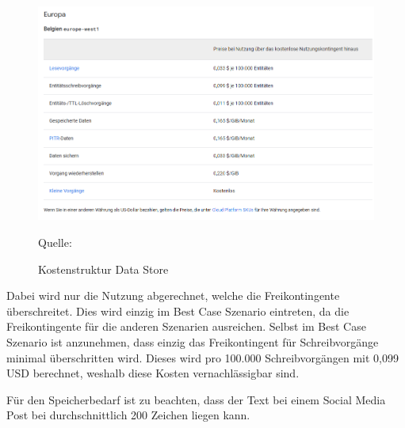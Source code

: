 \begin{figure}[htbp]
    \includegraphics[width=\textwidth, height=\textheight, keepaspectratio]{abbildungen/kostendatastore}
    \caption{Kostenstruktur Data Store}
    \label{fig:KostenDataStore}
    \raggedright Quelle:\cite{GoogleDatastorePricing2025}
\end{figure}


Dabei wird nur die Nutzung abgerechnet, welche die Freikontingente überschreitet.
Dies wird einzig im Best Case Szenario eintreten, da die Freikontingente für die anderen Szenarien ausreichen.
Selbst im Best Case Szenario ist anzunehmen, dass einzig das Freikontingent für Schreibvorgänge minimal überschritten wird.
Dieses wird pro 100.000 Schreibvorgängen mit 0,099 \ac{USD} berechnet, weshalb diese Kosten vernachlässigbar sind.

Für den Speicherbedarf ist zu beachten, dass der Text bei einem Social Media Post bei durchschnittlich 200 Zeichen liegen kann.

